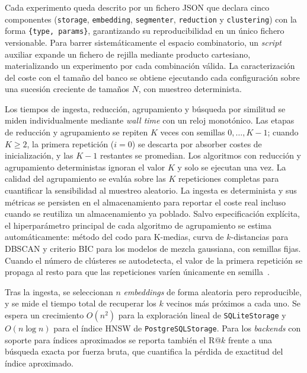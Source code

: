 Cada experimento queda descrito por un fichero JSON que declara cinco
componentes (\texttt{storage}, \texttt{embedding}, \texttt{segmenter},
\texttt{reduction} y \texttt{clustering}) con la forma \texttt{\{type,
params\}}, garantizando su reproducibilidad en un único fichero versionable.
Para barrer sistemáticamente el espacio combinatorio, un \textit{script}
auxiliar expande un fichero de rejilla mediante producto cartesiano,
materializando un experimento por cada combinación válida. La caracterización
del coste con el tamaño del banco se obtiene ejecutando cada configuración
sobre una sucesión creciente de tamaños $N$, con muestreo determinista.

Los tiempos de ingesta, reducción, agrupamiento y búsqueda por similitud se
miden individualmente mediante \textit{wall time} con un reloj monotónico. Las
etapas de reducción y agrupamiento se repiten $K$ veces con semillas
$0,\ldots,K-1$; cuando $K\geq2$, la primera repetición ($i=0$) se descarta por
absorber costes de inicialización, y las $K-1$ restantes se promedian. Los
algoritmos con reducción y agrupamiento deterministas ignoran el valor $K$ y
solo se ejecutan una vez. La calidad del agrupamiento se evalúa sobre las $K$
repeticiones completas para cuantificar la sensibilidad al muestreo aleatorio.
La ingesta es determinista y sus métricas se persisten en el almacenamiento
para reportar el coste real incluso cuando se reutiliza un almacenamiento ya
poblado. Salvo especificación explícita, el hiperparámetro principal de cada
algoritmo de agrupamiento se estima automáticamente: método del codo para
K-medias, curva de $k$-distancias para DBSCAN y criterio BIC para los modelos
de mezcla gaussiana, con semillas fijas. Cuando el número de clústeres se
autodetecta, el valor de la primera repetición se propaga al resto para que las
repeticiones varíen únicamente en
semilla~\cite{franti_k-means_2018,ahmed_k-means_2020}.

Tras la ingesta, se seleccionan $n$ \textit{embeddings} de forma aleatoria
pero reproducible, y se mide el tiempo total de recuperar los $k$ vecinos más
próximos a cada uno. Se espera un crecimiento $O(n^2)$ para la exploración
lineal de \texttt{SQLiteStorage} y $O(n\log n)$ para el índice HNSW de
\texttt{PostgreSQLStorage}. Para los \textit{backends} con soporte para
índices aproximados se reporta también el R@$k$ frente a una búsqueda exacta
por fuerza bruta, que cuantifica la pérdida de exactitud del índice aproximado.

